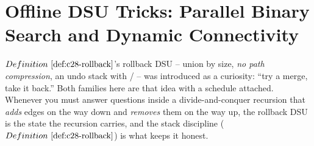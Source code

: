 \section{Offline DSU Tricks: Parallel Binary Search and Dynamic Connectivity}%
\label{sec:c28-offline}

\begin{previouslybox}
\(\defref{c28-rollback}\)'s rollback DSU -- union by size, \emph{no path
compression}, an undo stack with / -- was
introduced as a curiosity: ``try a merge, take it back.''  Both families here
are that idea with a schedule attached.  Whenever you must answer questions
inside a divide-and-conquer recursion that \emph{adds} edges on the way down
and \emph{removes} them on the way up, the rollback DSU is the state the
recursion carries, and the stack discipline (\(\defref{c28-rollback}\)) is what
keeps it honest.
\end{previouslybox}

